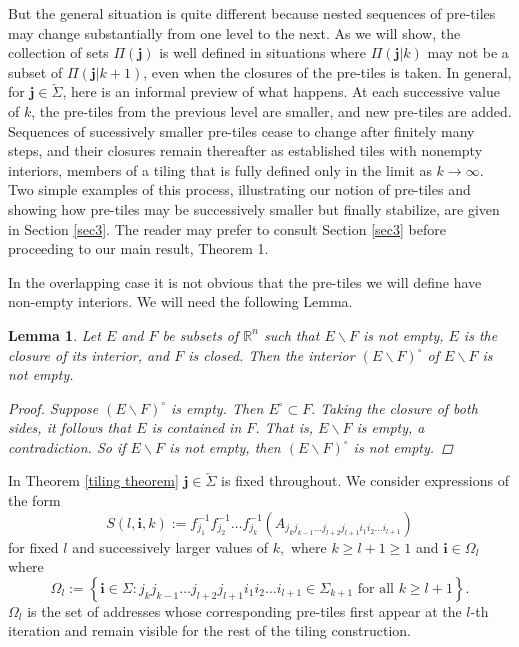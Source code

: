 \documentclass{amsproc}%
\theoremstyle{plain}
\newtheorem{lemma}{Lemma}
\theoremstyle{definition}
\numberwithin{equation}{section}
\begin{document}
But the general situation is quite different because nested sequences of
pre-tiles may change substantially from one level to the next. As we will
show, the collection of sets $\Pi(\mathbf{j})$ is well defined in situations
where $\Pi(\mathbf{j}|k)$ may not be a subset of $\Pi(\mathbf{j}|k+1)$, even
when the closures of the pre-tiles is taken. In general, for $\mathbf{j}%
\in\overleftarrow{\Sigma}$, here is an informal preview of what happens. At
each successive value of $k$, the pre-tiles from the previous level are
smaller, and new pre-tiles are added. Sequences of sucessively smaller
pre-tiles cease to change after finitely many steps, and their closures remain
thereafter as established tiles with nonempty interiors, members of a tiling
that is fully defined only in the limit as $k\rightarrow\infty$. Two simple
examples of this process, illustrating our notion of pre-tiles and showing how
pre-tiles may be successively smaller but finally stabilize, are given in
Section \ref{sec3}. The reader may prefer to consult Section \ref{sec3} before
proceeding to our main result, Theorem 1.

In the overlapping case it is not obvious that the pre-tiles we will define
have non-empty interiors. We will need the following Lemma.

\begin{lemma}
\label{lemmafour} Let $E$ and $F$ be subsets of $\mathbb{R}^{n}$ such that
$E\backslash F$ is not empty, $E$ is the closure of its interior, and $F$ is
closed. Then the interior $\left(  E\backslash F\right)  ^{\circ}$ of
$E\backslash F$ is not empty.

\begin{proof}
Suppose $\left(  E\backslash F\right)  ^{\circ}$ is empty. Then $E^{\circ
}\subset F.$ Taking the closure of both sides, it follows that $E$ is
contained in $F$. That is, $E\backslash F$ is empty, a contradiction. So if
$E\backslash F$ is not empty, then $\left(  E\backslash F\right)  ^{\circ}$ is
not empty.
\end{proof}
\end{lemma}

In Theorem \ref{tiling theorem} $\mathbf{j\in}\overleftarrow{\Sigma}$ is fixed
throughout. We consider expressions of the form%
\[
S(l,\mathbf{i},k):=f_{j_{1}}^{-1}f_{j_{2}}^{-1}\dots f_{j_{k}}^{-1}%
(A_{j_{k}j_{k-1}\dots j_{l+2}j_{l+1}i_{1}i_{2}\dots i_{l+1}})
\]
for fixed $l$ and successively larger values of $k,$ where $k\geq l+1\geq1$
and $\mathbf{i\in}\Omega_{l}$ where
\[
\Omega_{l}:=\left\{  \mathbf{i}\in\Sigma:j_{k}j_{k-1}\dots j_{l+2}j_{l+1}%
i_{1}i_{2}\dots i_{l+1}\in\Sigma_{k+1}\text{ for all }k\geq l+1\right\}  .
\]
$\Omega_{l}$ is the set of addresses whose corresponding pre-tiles first
appear at the $l$-th iteration and remain visible for the rest of the tiling
construction. 
\end{document}
